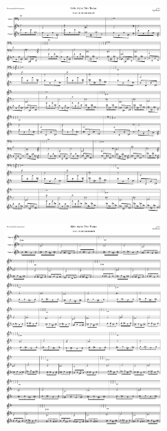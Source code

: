 \begin{figure}[H]                                             
{                                                             
  \setlength{\tabcolsep}{3.0pt}                               
  \setlength\cmidrulewidth{\heavyrulewidth} %
    \begin{subfigure}{0.5\textwidth}                            
  \includegraphics[width=6cm]{music/title_no_29_page_1001.png}%
    \end{subfigure}                                             
  \begin{subfigure}{0.5\textwidth}                            
  \includegraphics[width=6cm]{music/title_no_30_page_1001.png}%
    \end{subfigure}                                             
}                                                             
\end{figure}                                                  


